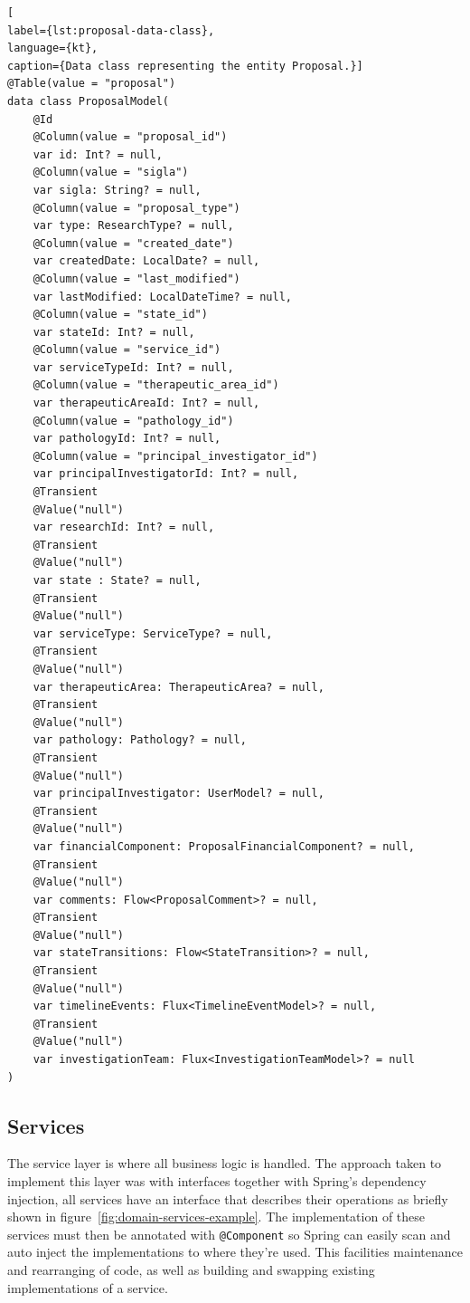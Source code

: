 \begin{lstlisting}[
label={lst:proposal-data-class},
language={kt},
caption={Data class representing the entity Proposal.}]
@Table(value = "proposal")
data class ProposalModel(
    @Id
    @Column(value = "proposal_id")
    var id: Int? = null,
    @Column(value = "sigla")
    var sigla: String? = null,
    @Column(value = "proposal_type")
    var type: ResearchType? = null,
    @Column(value = "created_date")
    var createdDate: LocalDate? = null,
    @Column(value = "last_modified")
    var lastModified: LocalDateTime? = null,
    @Column(value = "state_id")
    var stateId: Int? = null,
    @Column(value = "service_id")
    var serviceTypeId: Int? = null,
    @Column(value = "therapeutic_area_id")
    var therapeuticAreaId: Int? = null,
    @Column(value = "pathology_id")
    var pathologyId: Int? = null,
    @Column(value = "principal_investigator_id")
    var principalInvestigatorId: Int? = null,
    @Transient
    @Value("null")
    var researchId: Int? = null,
    @Transient
    @Value("null")
    var state : State? = null,
    @Transient
    @Value("null")
    var serviceType: ServiceType? = null,
    @Transient
    @Value("null")
    var therapeuticArea: TherapeuticArea? = null,
    @Transient
    @Value("null")
    var pathology: Pathology? = null,
    @Transient
    @Value("null")
    var principalInvestigator: UserModel? = null,
    @Transient
    @Value("null")
    var financialComponent: ProposalFinancialComponent? = null,
    @Transient
    @Value("null")
    var comments: Flow<ProposalComment>? = null,
    @Transient
    @Value("null")
    var stateTransitions: Flow<StateTransition>? = null,
    @Transient
    @Value("null")
    var timelineEvents: Flux<TimelineEventModel>? = null,
    @Transient
    @Value("null")
    var investigationTeam: Flux<InvestigationTeamModel>? = null
)
\end{lstlisting}

\subsection{Services}\label{ch:impl:sec:be:subsec:services}

The service layer is where all business logic is handled. The approach taken to implement this layer was with interfaces together with Spring's dependency injection, all services have an interface that describes their operations as briefly shown in figure~\ref{fig:domain-services-example}. The implementation of these services must then be annotated with \lstinline{@Component} so Spring can easily scan and auto inject the implementations to where they're used. This facilities maintenance and rearranging of code, as well as building and swapping existing implementations of a service.


